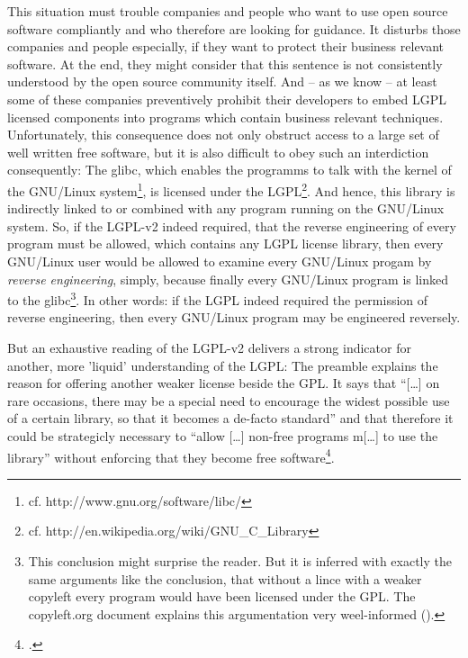 This situation must trouble companies and people who want to use open source
software compliantly and who therefore are looking for guidance. It disturbs
those companies and people especially, if they want to protect their business
relevant software. At the end, they might consider that this sentence is not
consistently understood by the open source community itself. And -- as we know
-- at least some of these companies preventively prohibit their developers to
embed LGPL licensed components into programs which contain business relevant
techniques. Unfortunately, this consequence does not only obstruct access to a
large set of well written free software, but it is also difficult to obey such
an interdiction consequently: The glibc, which enables the programms to talk
with the kernel of the GNU/Linux system\footnote{cf.
http://www.gnu.org/software/libc/}, is licensed under the LGPL\footnote{cf.
http://en.wikipedia.org/wiki/GNU\_C\_Library}. And hence, this library is
indirectly linked to or combined with any program running on the GNU/Linux
system. So, if the LGPL-v2 indeed required, that the reverse engineering of
every program must be allowed, which contains any LGPL license library, then
every GNU/Linux user would be allowed to examine every GNU/Linux progam by
\emph{reverse engineering}, simply, because finally every GNU/Linux program is
linked to the glibc\footnote{This conclusion might surprise the reader. But it
is inferred with exactly the same arguments like the conclusion, that without a
lince with a weaker copyleft every program would have been licensed under the
GPL. The copyleft.org document explains this argumentation very weel-informed
(\cite[cf.][56f]{KuhSebGin2014a}).}. In other words: if the LGPL indeed required
the permission of reverse engineering, then every GNU/Linux program may be
engineered reversely.

But an exhaustive reading of the LGPL-v2 delivers a strong indicator for
another, more 'liquid' understanding of the LGPL: The preamble explains the
reason for offering another weaker license beside the GPL. It says that
\enquote{[\ldots] on rare occasions, there may be a special need to encourage
the widest possible use of a certain library, so that it becomes a de-facto
standard} and that therefore it could be strategicly necessary to \enquote{allow
[\ldots] non-free programs m[\ldots] to use the library} without enforcing that
they become free software\footcite[cf.][\nopage wp,
§preamble]{Lgpl21OsiLicense1999a}.

